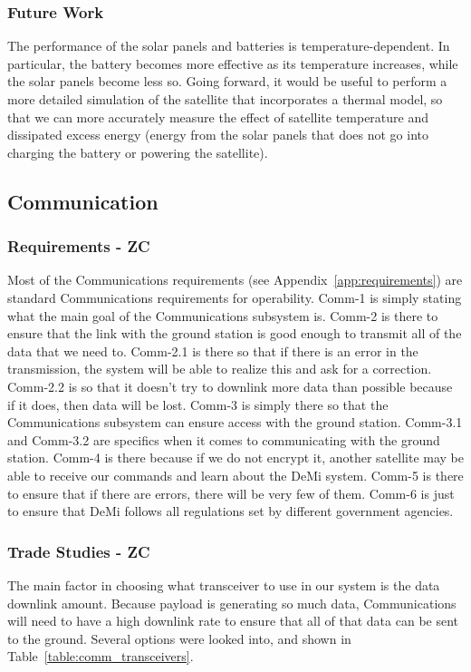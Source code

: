 \documentclass[12pt]{article}
\begin{document}
			\subsubsection{Future Work}
The performance of the solar panels and batteries is temperature-dependent.  In particular, the battery becomes more effective as its temperature increases, while the solar panels become less so.  Going forward, it would be useful to perform a more detailed simulation of the satellite that incorporates a thermal model, so that we can more accurately measure the effect of satellite temperature and dissipated excess energy (energy from the solar panels that does not go into charging the battery or powering the satellite).



		\subsection{Communication}

			\subsubsection{Requirements - ZC}

Most of the Communications requirements (see Appendix~\ref{app:requirements}) are standard Communications requirements for operability. Comm-1 is simply stating what the main goal of the Communications subsystem is. Comm-2 is there to ensure that the link with the ground station is good enough to transmit all of the data that we need to. Comm-2.1 is there so that if there is an error in the transmission, the system will be able to realize this and ask for a correction. Comm-2.2 is so that it doesn’t try to downlink more data than possible because if it does, then data will be lost. Comm-3 is simply there so that the Communications subsystem can ensure access with the ground station. Comm-3.1 and Comm-3.2 are specifics when it comes to communicating with the ground station. Comm-4 is there because if we do not encrypt it, another satellite may be able to receive our commands and learn about the DeMi system. Comm-5 is there to ensure that if there are errors, there will be very few of them. Comm-6 is just to ensure that DeMi follows all regulations set by different government agencies.

			\subsubsection{Trade Studies - ZC}\label{sec:comm_tradestudies}
The main factor in choosing what transceiver to use in our system is the data downlink amount. Because payload is generating so much data, Communications will need to have a high downlink rate to ensure that all of that data can be sent to the ground. Several options were looked into, and shown in Table~\ref{table:comm_transceivers}.
\end{document}
